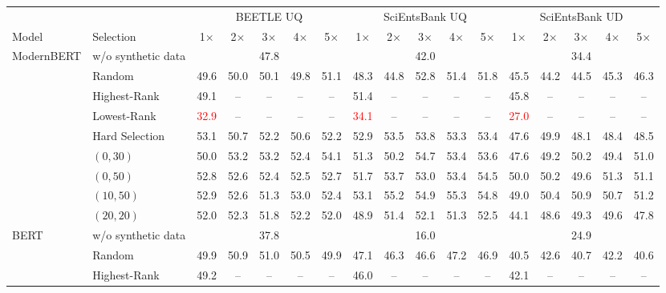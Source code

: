 \begin{table}[t]
\centering
\footnotesize
\setlength{\tabcolsep}{2pt}
\begin{tabular}{llccccccccccccccc}
\toprule
 & & \multicolumn{5}{c}{BEETLE UQ} & \multicolumn{5}{c}{SciEntsBank UQ} & \multicolumn{5}{c}{SciEntsBank UD} \\
\cmidrule(lr){3-7}\cmidrule(lr){8-12}\cmidrule(lr){13-17}
Model & Selection & 1$\times$ & 2$\times$ & 3$\times$ & 4$\times$ & 5$\times$ & 1$\times$ & 2$\times$ & 3$\times$ & 4$\times$ & 5$\times$ & 1$\times$ & 2$\times$ & 3$\times$ & 4$\times$ & 5$\times$ \\
\midrule
\multirow{9}{*}{ModernBERT} & w/o synthetic data & \multicolumn{5}{c}{47.8} & \multicolumn{5}{c}{42.0} & \multicolumn{5}{c}{34.4} \\
 & Random & 49.6 & 50.0 & 50.1 & 49.8 & 51.1 & 48.3 & 44.8 & 52.8 & 51.4 & 51.8 & 45.5 & 44.2 & 44.5 & 45.3 & 46.3 \\
 & Highest-Rank & 49.1 & -- & -- & -- & -- & 51.4 & -- & -- & -- & -- & 45.8 & -- & -- & -- & -- \\
 & Lowest-Rank & \textcolor{red}{32.9} & -- & -- & -- & -- & \textcolor{red}{34.1} & -- & -- & -- & -- & \textcolor{red}{27.0} & -- & -- & -- & -- \\
 & Hard Selection & 53.1 & 50.7 & 52.2 & 50.6 & 52.2 & 52.9 & 53.5 & 53.8 & 53.3 & 53.4 & 47.6 & 49.9 & 48.1 & 48.4 & 48.5 \\
 & $(0, 30)$ & 50.0 & 53.2 & 53.2 & 52.4 & 54.1 & 51.3 & 50.2 & 54.7 & 53.4 & 53.6 & 47.6 & 49.2 & 50.2 & 49.4 & 51.0 \\
 & $(0, 50)$ & 52.8 & 52.6 & 52.4 & 52.5 & 52.7 & 51.7 & 53.7 & 53.0 & 53.4 & 54.5 & 50.0 & 50.2 & 49.6 & 51.3 & 51.1 \\
 & $(10, 50)$ & 52.9 & 52.6 & 51.3 & 53.0 & 52.4 & 53.1 & 55.2 & 54.9 & 55.3 & 54.8 & 49.0 & 50.4 & 50.9 & 50.7 & 51.2 \\
 & $(20, 20)$ & 52.0 & 52.3 & 51.8 & 52.2 & 52.0 & 48.9 & 51.4 & 52.1 & 51.3 & 52.5 & 44.1 & 48.6 & 49.3 & 49.6 & 47.8 \\
\midrule
\multirow{9}{*}{BERT} & w/o synthetic data & \multicolumn{5}{c}{37.8} & \multicolumn{5}{c}{16.0} & \multicolumn{5}{c}{24.9} \\
 & Random & 49.9 & 50.9 & 51.0 & 50.5 & 49.9 & 47.1 & 46.3 & 46.6 & 47.2 & 46.9 & 40.5 & 42.6 & 40.7 & 42.2 & 40.6 \\
 & Highest-Rank & 49.2 & -- & -- & -- & -- & 46.0 & -- & -- & -- & -- & 42.1 & -- & -- & -- & -- \\

\end{tabular}
\end{table}
